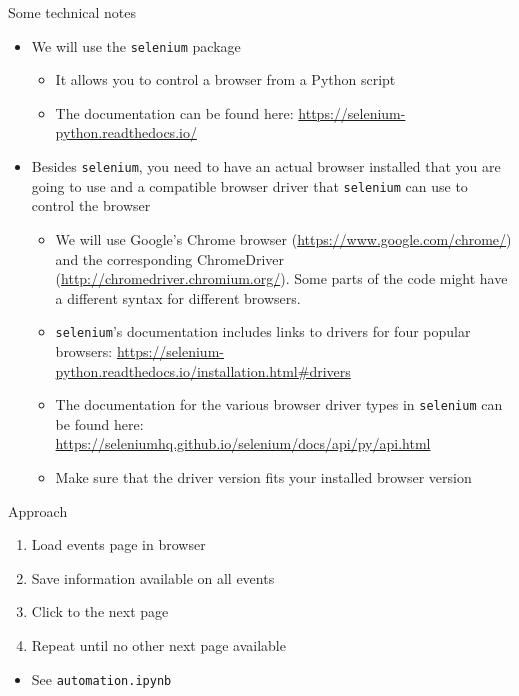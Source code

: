 \begin{frame}[fragile]{Some technical notes}
\begin{itemize}
	\item We will use the \verb!selenium! package
	\begin{itemize}
		\item It allows you to control a browser from a Python script
		\item The documentation can be found here: \url{https://selenium-python.readthedocs.io/}
	\end{itemize}
	\item Besides \verb!selenium!, you need to have an actual browser installed that you are going to use and a compatible browser driver that \verb!selenium! can use to control the browser
	\begin{itemize}
		\item We will use Google's Chrome browser (\url{https://www.google.com/chrome/}) and the corresponding ChromeDriver (\url{http://chromedriver.chromium.org/}). Some parts of the code might have a different syntax for different browsers.
		\item \verb!selenium!'s documentation includes links to drivers for four popular browsers: \url{https://selenium-python.readthedocs.io/installation.html#drivers}
		\item The documentation for the various browser driver types in \verb!selenium! can be found here: \url{https://seleniumhq.github.io/selenium/docs/api/py/api.html}
		\item Make sure that the driver version fits your installed browser version
	\end{itemize}
\end{itemize}
\end{frame}

\begin{frame}[fragile]{Approach}
\begin{enumerate}
	\item Load events page in browser
	\item Save information available on all events
	\item Click to the next page
	\item Repeat until no other next page available
\end{enumerate}
\begin{itemize}
	\item See \verb!automation.ipynb!
\end{itemize}
\end{frame}